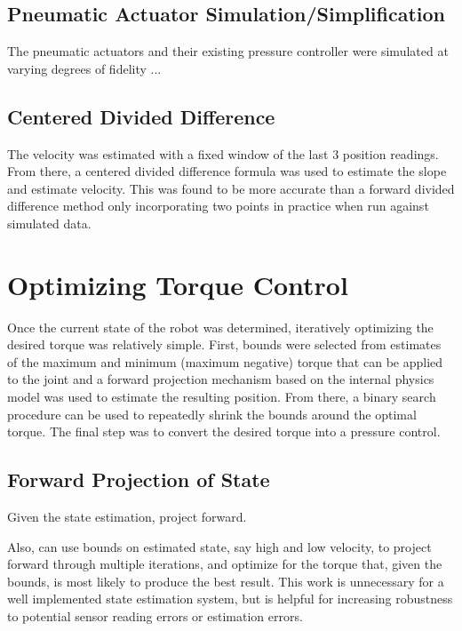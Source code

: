 \subsection{Pneumatic Actuator Simulation/Simplification}

The pneumatic actuators and their existing pressure controller were simulated 
at varying degrees of fidelity ...


\subsection{Centered Divided Difference}

The velocity was estimated with a fixed window of the last 3 position readings.
From there, a centered divided difference formula was used to estimate the
slope and estimate velocity. This was found to be more accurate than a forward
divided difference method only incorporating two points in practice when run
against simulated data.



\section{Optimizing Torque Control}

Once the current state of the robot was determined, iteratively optimizing the
desired torque was relatively simple. First, bounds were selected from estimates
of the maximum and minimum (maximum negative) torque that can be applied to the
joint and a forward projection mechanism based on the internal physics model was
used to estimate the resulting position. From there, a binary search procedure
can be used to repeatedly shrink the bounds around the optimal torque. The final
step was to convert the desired torque into a pressure control.

\subsection{Forward Projection of State}

Given the state estimation, project forward.

Also, can use bounds on estimated state, say high and low velocity, to project
forward through multiple iterations, and optimize for the torque that, given the
bounds, is most likely to produce the best result. This work is unnecessary for
a well implemented state estimation system, but is helpful for increasing
robustness to potential sensor reading errors or estimation errors.

